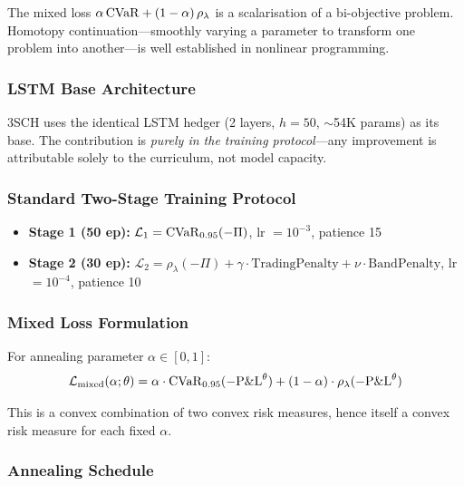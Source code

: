 The mixed loss $\alpha\,\mathrm{CVaR} + (1-\alpha)\,\rho_\lambda$ is a scalarisation of a bi-objective problem. Homotopy continuation---smoothly varying a parameter to transform one problem into another---is well established in nonlinear programming.

\subsubsection{LSTM Base Architecture}

3SCH uses the identical LSTM hedger (2 layers, $h=50$, $\sim$54K params) as its base. The contribution is \emph{purely in the training protocol}---any improvement is attributable solely to the curriculum, not model capacity.

\subsubsection{Standard Two-Stage Training Protocol}

\begin{itemize}[noitemsep]
    \item \textbf{Stage 1 (50 ep):} $\mathcal{L}_1 = \mathrm{CVaR}_{0.95}(-\Pi)$, lr $= 10^{-3}$, patience 15
    \item \textbf{Stage 2 (30 ep):} $\mathcal{L}_2 = \rho_\lambda(-\Pi) + \gamma \cdot \mathrm{TradingPenalty} + \nu \cdot \mathrm{BandPenalty}$, lr $= 10^{-4}$, patience 10
\end{itemize}

\subsubsection{Mixed Loss Formulation}

\begin{definition}
For annealing parameter $\alpha \in [0, 1]$:
\begin{equation}
    \mathcal{L}_{\mathrm{mixed}}(\alpha; \theta) = \alpha \cdot \mathrm{CVaR}_{0.95}(-\mathrm{P\&L}^\theta) + (1-\alpha) \cdot \rho_\lambda(-\mathrm{P\&L}^\theta)
\end{equation}
\end{definition}

This is a convex combination of two convex risk measures, hence itself a convex risk measure for each fixed $\alpha$.

\subsubsection{Annealing Schedule}

